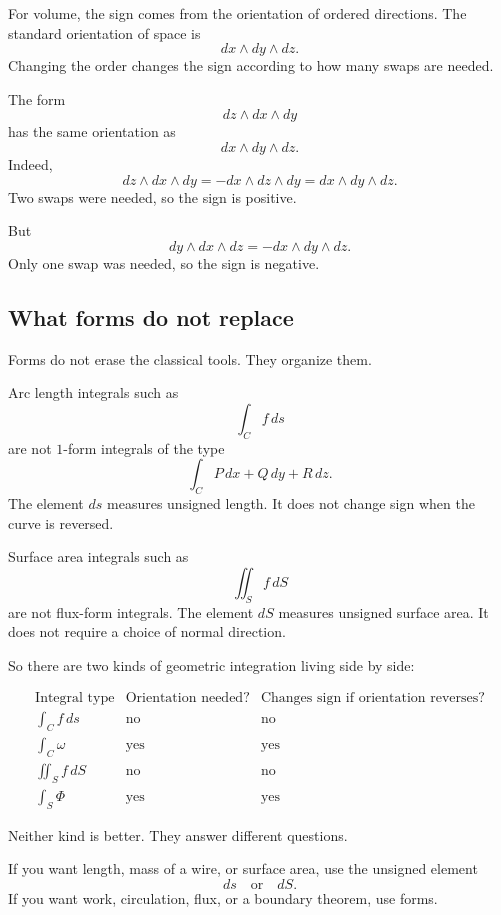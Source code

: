 For volume, the sign comes from the orientation of ordered directions.  The standard
orientation of space is
\[
    dx\wedge dy\wedge dz.
\]
Changing the order changes the sign according to how many swaps are needed.

\begin{example}
The form
\[
    dz\wedge dx\wedge dy
\]
has the same orientation as
\[
    dx\wedge dy\wedge dz.
\]
Indeed,
\[
    dz\wedge dx\wedge dy
    =
    -dx\wedge dz\wedge dy
    =
    dx\wedge dy\wedge dz.
\]
Two swaps were needed, so the sign is positive.

But
\[
    dy\wedge dx\wedge dz
    =
    -dx\wedge dy\wedge dz.
\]
Only one swap was needed, so the sign is negative.
\end{example}

\subsection{What forms do not replace}

Forms do not erase the classical tools.  They organize them.

Arc length integrals such as
\[
    \int_C f\,ds
\]
are not \(1\)-form integrals of the type
\[
    \int_C P\,dx+Q\,dy+R\,dz.
\]
The element \(ds\) measures unsigned length.  It does not change sign when the curve is
reversed.

Surface area integrals such as
\[
    \iint_S f\,dS
\]
are not flux-form integrals.  The element \(dS\) measures unsigned surface area.  It
does not require a choice of normal direction.

So there are two kinds of geometric integration living side by side:

\[
\begin{array}{c|c|c}
\text{Integral type} & \text{Orientation needed?} & \text{Changes sign if orientation reverses?} \\ \hline
\displaystyle \int_C f\,ds & \text{no} & \text{no}\\[3mm]
\displaystyle \int_C \omega & \text{yes} & \text{yes}\\[3mm]
\displaystyle \iint_S f\,dS & \text{no} & \text{no}\\[3mm]
\displaystyle \int_S \Phi & \text{yes} & \text{yes}
\end{array}
\]

Neither kind is better.  They answer different questions.

If you want length, mass of a wire, or surface area, use the unsigned element
\[
    ds
    \quad\text{or}\quad
    dS.
\]
If you want work, circulation, flux, or a boundary theorem, use forms.

